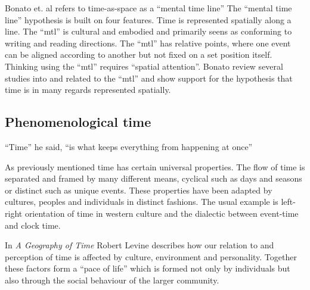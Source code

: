 \documentclass[11pt,UKenglish, a4paper]{article}
\begin{document}
Bonato et. al refers to time-as-space as a ``mental time line''\cite[p.~2258]{Bonato2012When} The ``mental time line'' hypothesis is built on four features. Time is represented spatially along a line. The ``mtl'' is cultural and embodied and primarily seens as conforming to writing and reading directions. The ``mtl'' has relative points, where one event can be aligned according to another but not fixed on a set position itself. Thinking using the ``mtl'' requires ``spatial attention''\cite*[p.~2258]{Bonato2012When}. Bonato review several studies into and related to the ``mtl'' and show support for the hypothesis that time is in many regards represented spatially. 

 \subsection{Phenomenological time}
\epigraph{``Time'' he said, ``is what keeps everything from happening at once''}{\cite[Ray Cummings, p.~46]{Cummings2005Girl}}

As previously mentioned time has certain universal properties. The flow of time is separated and framed by many different means, cyclical such as days and seasons or distinct such as unique events. These properties have been adapted by cultures, peoples and individuals in distinct fashions. The usual example is left-right orientation of time in western culture and the dialectic between event-time and clock time\cite[]{Levine2008Geography}. 

In \textit{A Geography of Time} Robert Levine describes how our relation to and perception of time is affected by culture, environment and personality. Together these factors form a ``pace of life''\cite[]{Levine2008Geography} which is formed not only by individuals but also through the social behaviour of the larger community.
\end{document}
